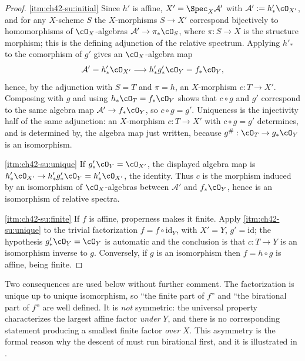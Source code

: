 \begin{proof}
\cref{itm:ch42-su:initial}  Since $h'$ is affine, $X'=\Spec_X\mathcal
A'$ with $\mathcal A':=h'_*\cO_{X'}$, and for any $X$-scheme $S$ the
$X$-morphisms $S\to X'$ correspond bijectively to homomorphisms of
$\cO_X$-algebras $\mathcal A'\to \pi_*\cO_S$, where $\pi:S\to X$ is the
structure morphism; this is the defining adjunction of the relative
spectrum.  Applying $h'_*$ to the comorphism of $g'$ gives an
$\cO_X$-algebra map
\[
 \mathcal A'=h'_*\cO_{X'}\longrightarrow h'_*g'_*\cO_Y=f_*\cO_Y,
\]
hence, by the adjunction with $S=T$ and $\pi=h$, an $X$-morphism
$c:T\to X'$.  Composing with $g$ and using $h_*\cO_T=f_*\cO_Y$ shows
that $c\circ g$ and $g'$ correspond to the same algebra map
$\mathcal A'\to f_*\cO_Y$, so $c\circ g=g'$.  Uniqueness is the
injectivity half of the same adjunction: an $X$-morphism $c:T\to X'$
with $c\circ g=g'$ determines, and is determined by, the algebra map just
written, because $g^\#:\cO_T\to g_*\cO_Y$ is an isomorphism.

\cref{itm:ch42-su:unique}  If $g'_*\cO_Y=\cO_{X'}$, the displayed algebra
map is
$h'_*\cO_{X'}\to h'_*g'_*\cO_Y=h'_*\cO_{X'}$, the identity.  Thus $c$ is
the morphism induced by an isomorphism of $\cO_X$-algebras between
$\mathcal A'$ and $f_*\cO_Y$, hence is an isomorphism of relative
spectra.

\cref{itm:ch42-su:finite}  If $f$ is affine, properness makes it finite.  Apply
\cref{itm:ch42-su:unique} to the trivial factorization
$f=f\circ\mathrm{id}_Y$, with $X'=Y$, $g'=\mathrm{id}$; the hypothesis
$g'_*\cO_Y=\cO_Y$ is automatic and the conclusion is that
$c:T\to Y$ is an isomorphism inverse to $g$.  Conversely, if $g$ is an
isomorphism then $f=h\circ g$ is affine, being finite.
\end{proof}

\begin{remark}
\label{rem:ch42-universal-buys}
Two consequences are used below without further comment.  The factorization
is unique up to unique isomorphism, so ``the finite part of $f$'' and ``the
birational part of $f$'' are well defined.  It is \emph{not} symmetric: the
universal property characterizes the largest
affine factor \emph{under} $Y$, and there is no corresponding statement
producing a smallest finite factor \emph{over} $X$.  This asymmetry is the
formal reason why the descent of  must run birational
first, and it is illustrated in .
\end{remark}

